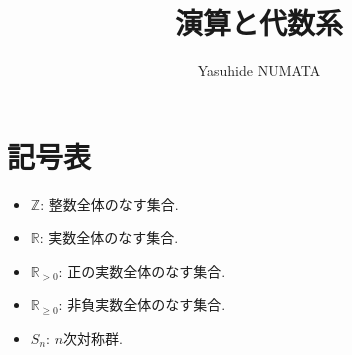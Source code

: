 \documentclass[tombow,dvipdfmx]{jsbook}
\theoremstyle{plain}
\theoremstyle{remark}
\theoremstyle{definition}
\newcommand{\ZZ}{\mathbb{Z}}
\newcommand{\RR}{\mathbb{R}}
\begin{document}
\title{演算と代数系}

\author{Yasuhide NUMATA}



\maketitle



\appendix
%

\section*{記号表}
\begin{itemize}
\item $\ZZ$: 整数全体のなす集合.
\item $\RR$: 実数全体のなす集合.
\item $\RR_{>0}$: 正の実数全体のなす集合.
\item $\RR_{\geq 0}$: 非負実数全体のなす集合.
\item $S_n$: $n$次対称群.
\end{itemize}
\end{document}
